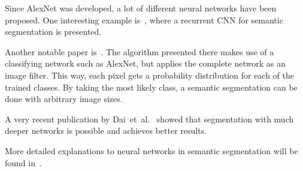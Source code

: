 Since AlexNet was developed, a lot of different neural networks have been
proposed. One interesting example is~\cite{pinheiro2013recurrent}, where
a recurrent \gls{CNN} for semantic segmentation is presented.

Another notable paper is~\cite{long2014fully}. The algorithm presented there
makes use of a classifying network such as AlexNet, but applies the complete
network as an image filter. This way, each pixel gets a probability
distribution for each of the trained classes. By taking the most likely class,
a semantic segmentation can be done with arbitrary image sizes.

A very recent publication by Dai~et~al.~\cite{dai2015instance} showed that
segmentation with much deeper networks is possible and achieves better results.

More detailed explanations to neural networks in semantic segmentation will be
found in~\cite{Teichmann2016}.
